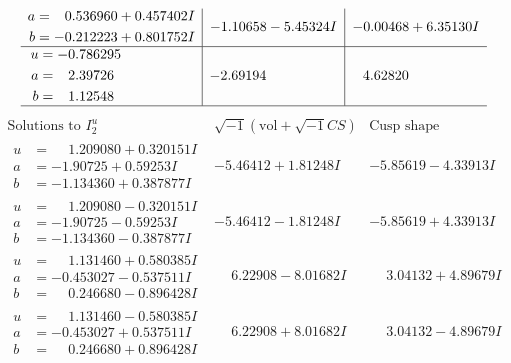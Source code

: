 \documentclass[1p]{elsarticle_modified}
\theoremstyle{definition}
\newcommand{\I}{\sqrt{-1}}
\begin{document}
$$\begin{array}{c|c|c}
\begin{aligned}
a &= \phantom{-}0.536960 + 0.457402 I \\
b &= -0.212223 + 0.801752 I\end{aligned}
 & -1.10658 - 5.45324 I & -0.00468 + 6.35130 I \\ \hline\begin{aligned}
u &= -0.786295\phantom{ +0.000000I} \\
a &= \phantom{-}2.39726\phantom{ +0.000000I} \\
b &= \phantom{-}1.12548\phantom{ +0.000000I}\end{aligned}
 & -2.69194\phantom{ +0.000000I} & \phantom{-}4.62820\phantom{ +0.000000I}\\
 \hline 
 \end{array}$$\newpage$$\begin{array}{c|c|c}  
\text{Solutions to }I^u_{2}& \I (\text{vol} + \sqrt{-1}CS) & \text{Cusp shape}\\
 \hline 
\begin{aligned}
u &= \phantom{-}1.209080 + 0.320151 I \\
a &= -1.90725 + 0.59253 I \\
b &= -1.134360 + 0.387877 I\end{aligned}
 & -5.46412 + 1.81248 I & -5.85619 - 4.33913 I \\ \hline\begin{aligned}
u &= \phantom{-}1.209080 - 0.320151 I \\
a &= -1.90725 - 0.59253 I \\
b &= -1.134360 - 0.387877 I\end{aligned}
 & -5.46412 - 1.81248 I & -5.85619 + 4.33913 I \\ \hline\begin{aligned}
u &= \phantom{-}1.131460 + 0.580385 I \\
a &= -0.453027 - 0.537511 I \\
b &= \phantom{-}0.246680 - 0.896428 I\end{aligned}
 & \phantom{-}6.22908 - 8.01682 I & \phantom{-}3.04132 + 4.89679 I \\ \hline\begin{aligned}
u &= \phantom{-}1.131460 - 0.580385 I \\
a &= -0.453027 + 0.537511 I \\
b &= \phantom{-}0.246680 + 0.896428 I\end{aligned}
 & \phantom{-}6.22908 + 8.01682 I & \phantom{-}3.04132 - 4.89679 I \\ \hline\begin{aligned}

\end{aligned}
\end{array}$$
\end{document}
